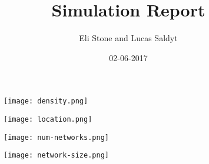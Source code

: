 \documentclass{article}
\title{Simulation Report}
\date{02-06-2017}
\author{Eli Stone and Lucas Saldyt}
\begin{document}
\maketitle
{}
\newpage
{}


\begin {figure}
\texttt{[image: density.png]}
\caption{}
\label{}
\end{figure}


\begin {figure}
\texttt{[image: location.png]}
\caption{}
\label{}
\end{figure}


\begin {figure}
\texttt{[image: num-networks.png]}
\caption{}
\label{}
\end{figure}


\begin {figure}
\texttt{[image: network-size.png]}
\caption{}
\label{}
\end{figure}
\end{document}
